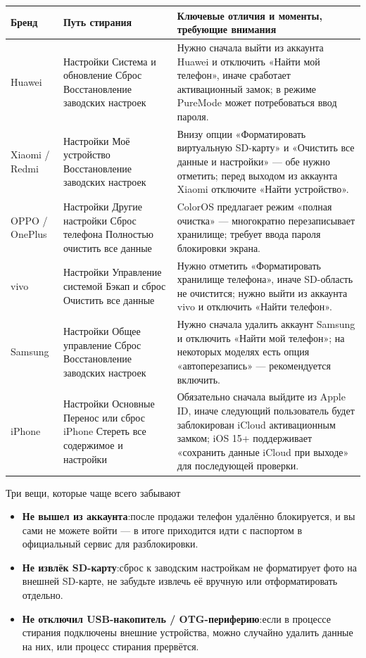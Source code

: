 \begin{center}
\begin{tabularx}{\linewidth}{|X|X|X|}
\hline
\textbf{Бренд} & \textbf{Путь стирания} & \textbf{Ключевые отличия и моменты, требующие внимания} \tabularnewline
\hline
Huawei & Настройки Система и обновление Сброс Восстановление заводских настроек & Нужно сначала выйти из аккаунта Huawei и отключить «Найти мой телефон», иначе сработает активационный замок; в режиме PureMode может потребоваться ввод пароля. \tabularnewline
Xiaomi / Redmi & Настройки Моё устройство Восстановление заводских настроек & Внизу опции «Форматировать виртуальную SD-карту» и «Очистить все данные и настройки» — обе нужно отметить; перед выходом из аккаунта Xiaomi отключите «Найти устройство». \tabularnewline
OPPO / OnePlus & Настройки Другие настройки Сброс телефона Полностью очистить все данные & ColorOS предлагает режим «полная очистка» — многократно перезаписывает хранилище; требует ввода пароля блокировки экрана. \tabularnewline
vivo & Настройки Управление системой Бэкап и сброс Очистить все данные & Нужно отметить «Форматировать хранилище телефона», иначе SD-область не очистится; нужно выйти из аккаунта vivo и отключить «Найти телефон». \tabularnewline
Samsung & Настройки Общее управление Сброс Восстановление заводских настроек & Нужно сначала удалить аккаунт Samsung и отключить «Найти мой телефон»; на некоторых моделях есть опция «автоперезапись» — рекомендуется включить. \tabularnewline
iPhone & Настройки Основные Перенос или сброс iPhone Стереть все содержимое и настройки & Обязательно сначала выйдите из Apple ID, иначе следующий пользователь будет заблокирован iCloud активационным замком; iOS 15+ поддерживает «сохранить данные iCloud при выходе» для последующей проверки. \tabularnewline
\hline
\end{tabularx}
\end{center}

\begin{tcbwarn}{Три вещи, которые чаще всего забывают}
\begin{itemize}
  \item \textbf{Не вышел из аккаунта}:после продажи телефон удалённо блокируется, и вы сами не можете войти — в итоге приходится идти с паспортом в официальный сервис для разблокировки.
  \item \textbf{Не извлёк SD-карту}:сброс к заводским настройкам не форматирует фото на внешней SD-карте, не забудьте извлечь её вручную или отформатировать отдельно.
  \item \textbf{Не отключил USB-накопитель / OTG-периферию}:если в процессе стирания подключены внешние устройства, можно случайно удалить данные на них, или процесс стирания прервётся.
\end{itemize}

\end{tcbwarn}

